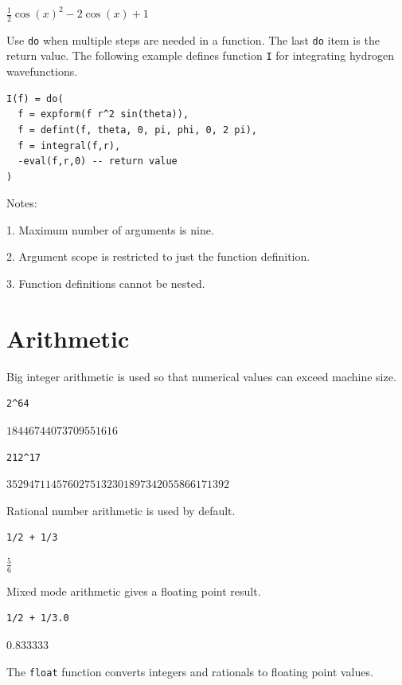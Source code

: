 \documentclass[12pt]{article}
\begin{document}
$\displaystyle \tfrac{1}{2}\cos(x)^2-2\cos(x)+1$

\bigskip
Use \verb$do$ when multiple steps are needed in a function.
The last \verb$do$ item is the return value.
The following example defines function \verb$I$ for
integrating hydrogen wavefunctions.

{\color{blue}
\begin{verbatim}
I(f) = do(
  f = expform(f r^2 sin(theta)),
  f = defint(f, theta, 0, pi, phi, 0, 2 pi),
  f = integral(f,r),
  -eval(f,r,0) -- return value
)
\end{verbatim}}

Notes:

1. Maximum number of arguments is nine.

2. Argument scope is restricted to just the function definition.

3. Function definitions cannot be nested.

\newpage

\section{Arithmetic}

Big integer arithmetic is used so that numerical values can
exceed machine size.

{\color{blue}
\begin{verbatim}
2^64
\end{verbatim}
}

$\displaystyle 18446744073709551616$

{\color{blue}
\begin{verbatim}
212^17
\end{verbatim}
}

$\displaystyle 3529471145760275132301897342055866171392$

\bigskip
Rational number arithmetic is used by default.

{\color{blue}
\begin{verbatim}
1/2 + 1/3
\end{verbatim}
}

$\displaystyle \tfrac{5}{6}$

\bigskip
Mixed mode arithmetic gives a floating point result.

{\color{blue}
\begin{verbatim}
1/2 + 1/3.0
\end{verbatim}
}

$\displaystyle 0.833333$

\bigskip
The \verb$float$ function converts integers and rationals to floating point values.
\end{document}

